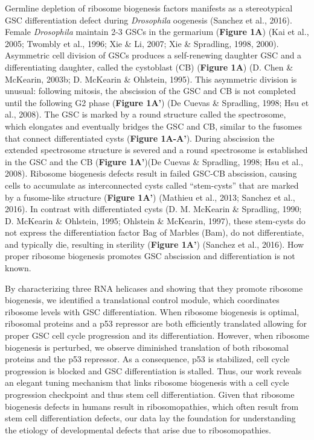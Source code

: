 \documentclass[12pt,oneside]{reedthesis}
\begin{document}
Germline depletion of ribosome biogenesis factors manifests as a
stereotypical GSC differentiation defect during \emph{Drosophila} oogenesis
(Sanchez et al., 2016). Female \emph{Drosophila} maintain 2-3 GSCs in the
germarium (\textbf{Figure 1A}) (Kai et al., 2005; Twombly et al., 1996; Xie \& Li, 2007; Xie \& Spradling, 1998, 2000). Asymmetric cell division of GSCs produces a
self-renewing daughter GSC and a differentiating daughter, called the
cystoblast (CB) (\textbf{Figure 1A}) (D. Chen \& McKearin, 2003b; D. McKearin \& Ohlstein, 1995). This
asymmetric division is unusual: following mitosis, the abscission of the
GSC and CB is not completed until the following G2 phase (\textbf{Figure
1A'}) (De Cuevas \& Spradling, 1998; Hsu et al., 2008). The GSC is
marked by a round structure called the spectrosome, which elongates and
eventually bridges the GSC and CB, similar to the fusomes that connect
differentiated cysts (\textbf{Figure 1A-A'}). During abscission the extended
spectrosome structure is severed and a round spectrosome is established
in the GSC and the CB (\textbf{Figure 1A'})(De Cuevas \& Spradling, 1998; Hsu et al., 2008). Ribosome biogenesis defects result in
failed GSC-CB abscission, causing cells to accumulate as interconnected
cysts called ``stem-cysts'' that are marked by a fusome-like structure
(\textbf{Figure 1A'}) (Mathieu et al., 2013; Sanchez et al., 2016). In contrast with
differentiated cysts (D. M. McKearin \& Spradling, 1990; D. McKearin \& Ohlstein, 1995; Ohlstein \& McKearin, 1997), these stem-cysts do not
express the differentiation factor Bag of Marbles (Bam), do not
differentiate, and typically die, resulting in sterility (\textbf{Figure
1A'}) (Sanchez et al., 2016). How proper ribosome biogenesis promotes GSC
abscission and differentiation is not known.

By characterizing three RNA helicases and showing that they promote
ribosome biogenesis, we identified a translational control module, which
coordinates ribosome levels with GSC differentiation. When ribosome
biogenesis is optimal, ribosomal proteins and a p53 repressor are both
efficiently translated allowing for proper GSC cell cycle progression
and its differentiation. However, when ribosome biogenesis is perturbed,
we observe diminished translation of both ribosomal proteins and the p53
repressor. As a consequence, p53 is stabilized, cell cycle progression
is blocked and GSC differentiation is stalled. Thus, our work reveals an
elegant tuning mechanism that links ribosome biogenesis with a cell
cycle progression checkpoint and thus stem cell differentiation. Given
that ribosome biogenesis defects in humans result in ribosomopathies,
which often result from stem cell differentiation defects, our data lay
the foundation for understanding the etiology of developmental defects
that arise due to ribosomopathies.
\end{document}
